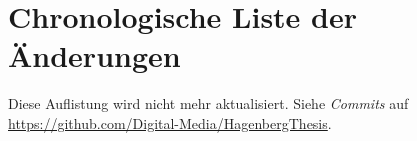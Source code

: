 \chapter{Chronologische Liste der Änderungen}


Diese Auflistung wird nicht mehr aktualisiert.
Siehe \emph{Commits} auf \url{https://github.com/Digital-Media/HagenbergThesis}.
